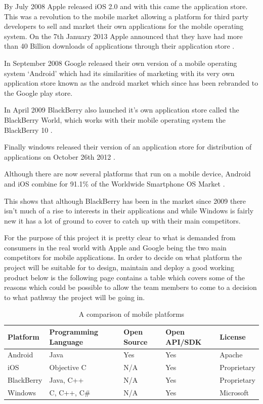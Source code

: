 By July 2008 Apple released iOS 2.0 and with this came the application store.
This was a revolution to the mobile market allowing a platform for third party
developers to sell and market their own applications for the mobile operating
system. On the 7th January 2013 Apple announced that they have had more than 40
Billion downloads of applications  through their application store
\citep{40billion12}.

In September 2008 Google released their own version of a mobile operating system
‘Android' which had its similarities of marketing with its very own application
store known as the android market which since has been rebranded to the Google
play store.

In April 2009 BlackBerry also launched it's own application store called the
BlackBerry World, which works with their mobile operating system the BlackBerry
10 \citep{bbworld09}.

Finally windows released their version of an application store for distribution 
of applications on October 26th 2012 \citep{windows8}.

Although there are now several platforms that run on a mobile device, Android
and iOS combine for 91.1\% of the Worldwide Smartphone OS Market \citep{idc13}.

This shows that although BlackBerry has been in the market since 2009 there
isn't much of a rise to interests in their applications and while Windows is 
fairly new it has a lot of ground to cover to catch up with their main 
competitors.

For the purpose of this project it is pretty clear to what is demanded from
consumers in the real world with Apple and Google being the two main competitors
for mobile applications. In order to decide on what platform the project will be
suitable for to design, maintain and deploy a good working product below is the
following page contains a table which covers some of the reasons which could be
possible to allow the team members to come to a decision to what pathway the
project will be going in.

\begin{table}[H]
  \centering
  \small
  \begin{tabular}{|p{2cm}|p{3cm}|p{2cm}|p{2.5cm}|p{2.5cm}|}
  \hline
  \textbf{Platform} & \textbf{Programming Language} & \textbf{Open Source} &
  \textbf{Open API/SDK} & \textbf{License} \\ \hline
  Android & Java & Yes & Yes & Apache \\ \hline
  iOS & Objective C & N/A & Yes & Proprietary \\ \hline
  BlackBerry & Java, C++ & N/A & Yes & Proprietary \\ \hline
  Windows & C, C++, C\#& N/A & Yes & Microsoft \\ \hline 
  \end{tabular}
  \caption {A comparison of mobile platforms}
\end{table}


